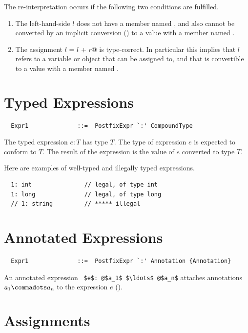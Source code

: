 The re-interpretation occurs if the following two conditions are fulfilled.
\begin{enumerate}
\item 
The left-hand-side $l$ does not have a member named
\code{+=}, and also cannot be converted by an implicit conversion ()
to a value with a member named \code{+=}.
\item
The assignment \lstinline@$l$ = $l$ + $r$@ is type-correct. 
In particular this implies that $l$ refers to a variable or object 
that can be assigned to, and that is convertible to a value with a member named \code{+}.
\end{enumerate}

\section{Typed Expressions}

\syntax\begin{lstlisting}
  Expr1              ::=  PostfixExpr `:' CompoundType
\end{lstlisting}

The typed expression $e: T$ has type $T$. The type of
expression $e$ is expected to conform to $T$. The result of
the expression is the value of $e$ converted to type $T$.

\example Here are examples of well-typed and illegally typed expressions.

\begin{lstlisting}
  1: int               // legal, of type int
  1: long              // legal, of type long
  // 1: string         // ***** illegal
\end{lstlisting}



\section{Annotated Expressions}

\syntax\begin{lstlisting}
  Expr1              ::=  PostfixExpr `:' Annotation {Annotation} 
\end{lstlisting}

An annotated expression ~\lstinline^$e$: @$a_1$ $\ldots$ @$a_n$^
attaches annotations $a_1 \commadots a_n$ to the expression $e$
().

\section{Assignments}\label{sec:assigments}


